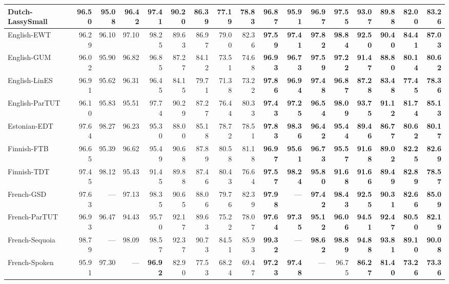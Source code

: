 \documentclass[11pt,a4paper]{article}
\begin{document}
\begin{table*}[p]
\begin{center}
\begin{tabular}{l|c||r|r|r|r|r|r|r|r||r|r|r|r|r|r|r|r}
Dutch-LassySmall &  & 96.50 & 95.08 & 96.42 & 97.41 & 90.20 & 86.39 & 77.19 & 78.83 & \bf 96.87 & \bf 95.91 & \bf 96.97 & \bf 97.55 & \bf 93.07 & \bf 89.88 & \bf 82.00 & \bf 83.26\\\hline
English-EWT &  & 96.29 & 96.10 & 97.10 & 98.25 & 89.63 & 86.97 & 79.00 & 82.36 & \bf 97.59 & \bf 97.41 & \bf 97.82 & \bf 98.84 & \bf 92.50 & \bf 90.40 & \bf 84.41 & \bf 87.03\\\hline
English-GUM &  & 96.02 & 95.90 & 96.82 & 96.85 & 87.27 & 84.12 & 73.51 & 74.68 & \bf 96.93 & \bf 96.73 & \bf 97.59 & \bf 97.22 & \bf 91.47 & \bf 88.80 & \bf 80.14 & \bf 80.62\\\hline
English-LinES &  & 96.91 & 95.62 & 96.31 & 96.45 & 84.15 & 79.71 & 71.38 & 73.22 & \bf 97.86 & \bf 96.94 & \bf 97.48 & \bf 96.87 & \bf 87.28 & \bf 83.48 & \bf 77.45 & \bf 78.36\\\hline
English-ParTUT &  & 96.10 & 95.83 & 95.51 & 97.74 & 90.29 & 87.27 & 76.44 & 80.33 & \bf 97.43 & \bf 97.25 & \bf 96.54 & \bf 98.09 & \bf 93.75 & \bf 91.12 & \bf 81.74 & \bf 85.13\\\hline
Estonian-EDT &  & 97.64 & 98.27 & 96.23 & 95.30 & 88.00 & 85.18 & 78.72 & 78.51 & \bf 97.83 & \bf 98.36 & \bf 96.42 & \bf 95.44 & \bf 89.46 & \bf 86.77 & \bf 80.62 & \bf 80.17\\\hline
Finnish-FTB &  & 96.65 & 95.39 & 96.62 & 95.49 & 90.68 & 87.89 & 80.58 & 81.18 & \bf 96.97 & \bf 95.61 & \bf 96.73 & \bf 95.57 & \bf 91.68 & \bf 89.02 & \bf 82.25 & \bf 82.69\\\hline
Finnish-TDT &  & 97.45 & 98.12 & 95.43 & 91.45 & 89.88 & 87.46 & 80.43 & 76.64 & \bf 97.57 & \bf 98.24 & \bf 95.80 & \bf 91.68 & \bf 91.66 & \bf 89.49 & \bf 82.89 & \bf 78.57\\\hline
French-GSD &  & 97.63 & --- & 97.13 & 98.35 & 90.65 & 88.06 & 79.76 & 82.39 & \bf 97.98 & --- & \bf 97.42 & \bf 98.43 & \bf 92.55 & \bf 90.31 & \bf 82.66 & \bf 85.09\\\hline
French-ParTUT &  & 96.93 & 96.47 & 94.43 & 95.70 & 92.17 & 89.63 & 75.22 & 78.07 & \bf 97.64 & \bf 97.35 & \bf 95.12 & \bf 96.06 & \bf 94.51 & \bf 92.47 & \bf 80.50 & \bf 82.19\\\hline
French-Sequoia &  & 98.79 & --- & 98.09 & 98.57 & 92.37 & 90.73 & 84.51 & 85.93 & \bf 99.32 & --- & \bf 98.62 & \bf 98.89 & \bf 94.88 & \bf 93.81 & \bf 89.10 & \bf 90.08\\\hline
French-Spoken &  & 95.91 & 97.30 & --- & \bf 96.92 & 82.90 & 77.53 & 68.24 & 69.47 & \bf 97.23 & \bf 97.48 & --- & 96.75 & \bf 86.27 & \bf 81.40 & \bf 73.26 & \bf 73.36\\\hline

\end{tabular}
\end{center}
\end{table*}
\end{document}

